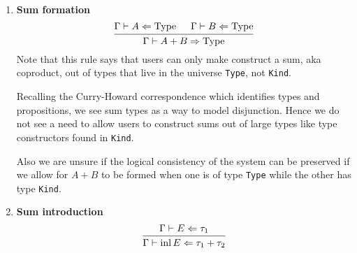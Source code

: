 \documentclass{article}
\begin{document}
\begin{definition} 
\begin{enumerate}


    \item \textbf{Sum formation} \\
    \[
      \begin{prooftree}
       \hypo{\Gamma \vdash A \Leftarrow \Type} 
       \hypo{\Gamma \vdash B \Leftarrow \Type} 
       \infer2{\Gamma \vdash A + B \Rightarrow \Type} 
      \end{prooftree}
    \]
    Note that this rule says that users can only make construct a sum, aka 
    coproduct, out of types that live in the universe \verb|Type|, not 
    \verb|Kind|.

    Recalling the Curry-Howard correspondence which identifies types and
    propositions, we see sum types as a way to model disjunction. Hence we do
    not see a need to allow users to construct sums out of large types like
    type constructors found in \verb|Kind|.

    Also we are unsure if the logical consistency of the system can be preserved
    if we allow for $A + B$ to be formed when one is of type \verb|Type| while
    the other has type \verb|Kind|. 

    \item \textbf{Sum introduction} \\
    \[
      \begin{prooftree}
       \hypo{\Gamma \vdash E \Leftarrow \tau_1} 
       \infer1{\Gamma \vdash \inl E \Leftarrow \tau_1 + \tau_2} 
      \end{prooftree}
    \]


\end{enumerate}
\end{definition}
\end{document}

